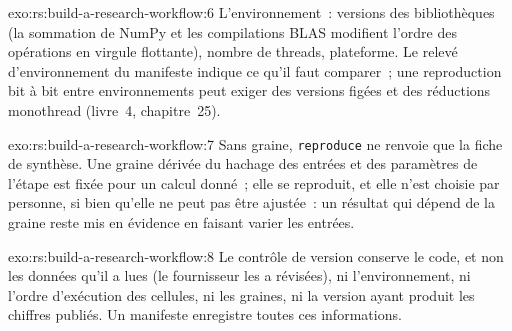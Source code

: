 \begin{solution}{exo:rs:build-a-research-workflow:6}
L'environnement~: versions des bibliothèques (la sommation de NumPy et les compilations BLAS modifient l'ordre des opérations en virgule flottante), nombre de threads, plateforme. Le
relevé d'environnement du manifeste indique ce qu'il faut comparer~; une reproduction bit à bit entre environnements peut exiger des versions figées et des réductions monothread (livre~4,
chapitre~25).
\end{solution}

\begin{solution}{exo:rs:build-a-research-workflow:7}
Sans graine, \texttt{reproduce} ne renvoie que la fiche de synthèse. Une graine dérivée du hachage des entrées et des paramètres de l'étape est fixée pour un calcul donné~;
elle se reproduit, et elle n'est choisie par personne, si bien qu'elle ne peut pas être ajustée~: un résultat qui dépend de la graine reste mis en évidence en faisant varier les entrées.
\end{solution}

\begin{solution}{exo:rs:build-a-research-workflow:8}
Le contrôle de version conserve le code, et non les données qu'il a lues (le fournisseur les a révisées), ni l'environnement, ni l'ordre d'exécution des cellules, ni les graines,
ni la version ayant produit les chiffres publiés. Un manifeste enregistre toutes ces informations.
\end{solution}

